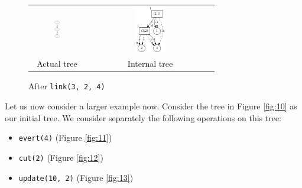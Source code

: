 \documentclass[a4paper, 11pt]{article}
\begin{document}
\begin{figure}[h]
\centering
\begin{tabular}{cc}
  \includegraphics[width=0.1\textwidth]{img/visualisations/test1/3.png} & \includegraphics[width=0.25\textwidth]{img/visualisations/test1/i3.png} \\
  Actual tree & Internal tree \\
\end{tabular}
\caption{After \texttt{link(3, 2, 4)}}
\label{fig:9}
\end{figure}

\pagebreak

Let us now consider a larger example now. Consider the tree in Figure \ref{fig:10} as our initial tree. We consider separately the following operations on this tree:
\begin{itemize}
    \item \texttt{evert(4)} (Figure \ref{fig:11})
    \item \texttt{cut(2)} (Figure \ref{fig:12})
    \item \texttt{update(10, 2)} (Figure \ref{fig:13})
\end{itemize}
\end{document}
